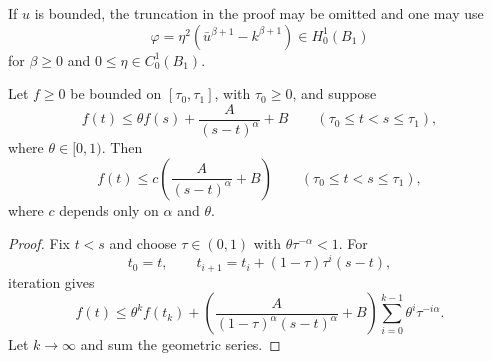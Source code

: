 \begin{remark}\label{hanlin:weaksol-part2-bounded-test-function}
If $u$ is bounded, the truncation in the proof may be omitted and one may use
\[
\varphi=\eta^2(\bar u^{\beta+1}-k^{\beta+1})
\in H^1_0(B_1)
\]
for $\beta\geq0$ and $0\leq\eta\in C^1_0(B_1)$.
\end{remark}

\begin{lemma}\label{hanlin:weaksol-part2-iteration-lemma}
Let $f\geq0$ be bounded on $[\tau_0,\tau_1]$, with $\tau_0\geq0$, and
suppose
\[
f(t)\leq\theta f(s)+\frac{A}{(s-t)^\alpha}+B
\qquad(\tau_0\leq t<s\leq\tau_1),
\]
where $\theta\in[0,1)$. Then
\[
f(t)\leq c\left(\frac{A}{(s-t)^\alpha}+B\right)
\qquad(\tau_0\leq t<s\leq\tau_1),
\]
where $c$ depends only on $\alpha$ and $\theta$.
\end{lemma}
\begin{proof}
\sketch Fix $t<s$ and choose $\tau\in(0,1)$ with
$\theta\tau^{-\alpha}<1$. For
\[
t_0=t,\qquad
t_{i+1}=t_i+(1-\tau)\tau^i(s-t),
\]
iteration gives
\[
f(t)\leq\theta^kf(t_k)+
\left(\frac{A}{(1-\tau)^\alpha(s-t)^\alpha}+B\right)
\sum_{i=0}^{k-1}\theta^i\tau^{-i\alpha}.
\]
Let $k\to\infty$ and sum the geometric series.
\end{proof}

